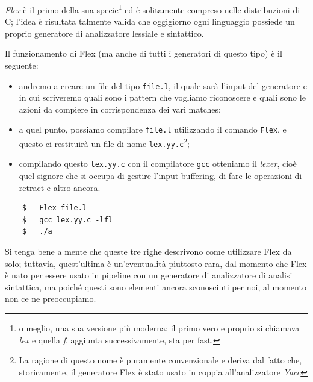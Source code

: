 \documentclass[class=book, crop=false, oneside, 12pt]{standalone}
\begin{document}
\emph{Flex} è il primo della sua specie\footnote{o meglio, una sua versione più moderna: il primo vero e proprio si chiamava \emph{lex} e quella \emph{f}, aggiunta successivamente, sta per fast.} ed è solitamente compreso nelle distribuzioni di C; l'idea è risultata talmente valida che oggigiorno ogni linguaggio possiede un proprio generatore di analizzatore lessiale e sintattico.

Il funzionamento di Flex (ma anche di tutti i generatori di questo tipo) è il seguente: 
\begin{itemize}
    \item andremo a creare un file del tipo \texttt{file.l}, il quale sarà l'input del generatore e in cui scriveremo quali sono i pattern che vogliamo riconoscere e quali sono le azioni da compiere in corrispondenza dei vari matches;
    \item a quel punto, possiamo compilare \texttt{file.l} utilizzando il comando \texttt{Flex}, e questo ci restituirà un file di nome \texttt{lex.yy.c}\footnote{La ragione di questo nome è puramente convenzionale e deriva dal fatto che, storicamente, il generatore Flex è stato usato in coppia all'analizzatore \emph{Yacc}};
    \item compilando questo \texttt{lex.yy.c} con il compilatore \texttt{gcc} otteniamo il \emph{lexer}, cioè quel signore che si occupa di gestire l'input buffering, di fare le operazioni di retract e altro ancora.
\end{itemize} 
\begin{verbatim}
    $   Flex file.l
    $   gcc lex.yy.c -lfl
    $   ./a
\end{verbatim}
Si tenga bene a mente che queste tre righe descrivono come utilizzare Flex da solo; tuttavia, quest'ultima è un'eventualità piuttosto rara, dal momento che Flex è nato per essere usato in pipeline con un generatore di analizzatore di analisi sintattica, ma poiché questi sono elementi ancora sconosciuti per noi, al momento non ce ne preoccupiamo.
\end{document}
